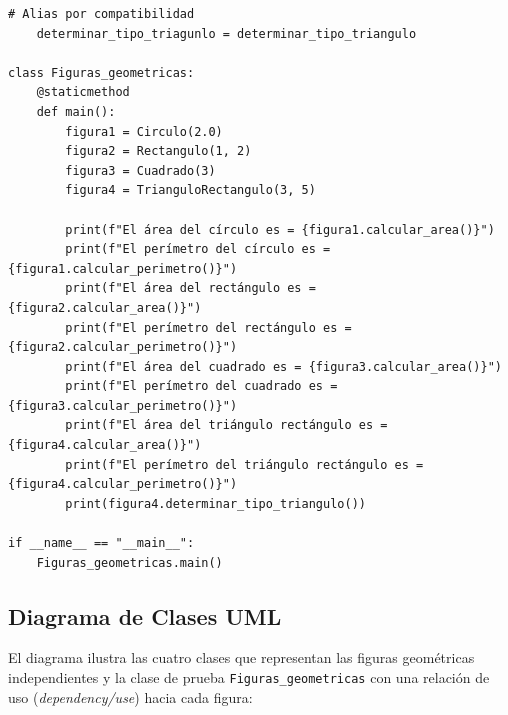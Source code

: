 \documentclass[11pt,a4paper]{article}
\begin{document}
\begin{lstlisting}[caption={Implementación de Figuras Geométricas (\texttt{Actividad2\_Ejercicio2\_4\_Figuras.py})}]
    # Alias por compatibilidad
    determinar_tipo_triagunlo = determinar_tipo_triangulo

class Figuras_geometricas:
    @staticmethod
    def main():
        figura1 = Circulo(2.0)
        figura2 = Rectangulo(1, 2)
        figura3 = Cuadrado(3)
        figura4 = TrianguloRectangulo(3, 5)

        print(f"El área del círculo es = {figura1.calcular_area()}")
        print(f"El perímetro del círculo es = {figura1.calcular_perimetro()}")
        print(f"El área del rectángulo es = {figura2.calcular_area()}")
        print(f"El perímetro del rectángulo es = {figura2.calcular_perimetro()}")
        print(f"El área del cuadrado es = {figura3.calcular_area()}")
        print(f"El perímetro del cuadrado es = {figura3.calcular_perimetro()}")
        print(f"El área del triángulo rectángulo es = {figura4.calcular_area()}")
        print(f"El perímetro del triángulo rectángulo es = {figura4.calcular_perimetro()}")
        print(figura4.determinar_tipo_triangulo())

if __name__ == "__main__":
    Figuras_geometricas.main()
\end{lstlisting}

\subsection{Diagrama de Clases UML}
El diagrama ilustra las cuatro clases que representan las figuras geométricas independientes y la clase de prueba \texttt{Figuras\_geometricas} con una relación de uso (\textit{dependency/use}) hacia cada figura:
\end{document}
